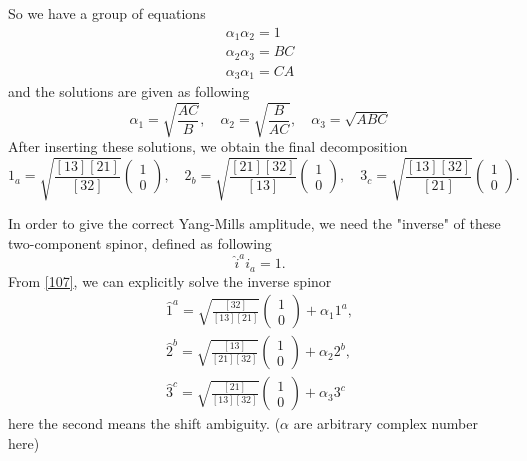 \documentclass[12pt]{article}
\begin{document}
So we have a group of equations
\begin{gather}
    \alpha_1\alpha_2=1\\
    \alpha_2\alpha_3=BC\\
    \alpha_3\alpha_1=CA
\end{gather}
and the solutions are given as following
\begin{equation}
    \alpha_1=\sqrt{\frac{AC}{B}}, \quad \alpha_2=\sqrt{\frac{B}{AC}},\quad \alpha_3=\sqrt{ABC}
\end{equation}
After inserting these solutions, we obtain the final decomposition
\begin{equation}
    1_a=\sqrt{\frac{[13][21]}{[32]}}\begin{pmatrix}
        1\\
        0
    \end{pmatrix},\quad 2_b=\sqrt{\frac{[21][32]}{[13]}}\begin{pmatrix}
        1\\
        0
    \end{pmatrix},\quad 3_c=\sqrt{\frac{[13][32]}{[21]}}\begin{pmatrix}
        1\\
        0
    \end{pmatrix}.\label{107}
\end{equation}

In order to give the correct Yang-Mills amplitude, we need the "inverse" of these two-component spinor, defined as following
\begin{equation}
    \hat{i}^a i_a=1.
\end{equation}
From \eqref{107}, we can explicitly solve the inverse spinor
\begin{gather}
    \hat{1}^a=\sqrt{\frac{[32]}{[13][21]}}\begin{pmatrix}
        1\\
        0
    \end{pmatrix}+\alpha_1 1^a, \\
    \hat{2}^b=\sqrt{\frac{[13]}{[21][32]}}\begin{pmatrix}
        1\\
        0
    \end{pmatrix}+\alpha_2 2^b, \\
    \hat{3}^c=\sqrt{\frac{[21]}{[13][32]}}\begin{pmatrix}
        1\\
        0
    \end{pmatrix} + \alpha_3 3^c
\end{gather}
here the second means the shift ambiguity. ($\alpha$ are arbitrary complex number here)
\end{document}
